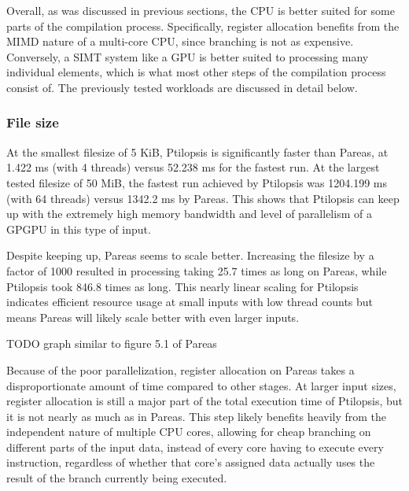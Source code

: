 \documentclass[12pt,dvipsnames]{article}
\newcommand{\helpme}[1]{{\color{red}#1}}
\begin{document}
Overall, as was discussed in previous sections, the CPU is better suited for some parts of the compilation process. Specifically, register allocation benefits from the MIMD nature of a multi-core CPU, since branching is not as expensive. Conversely, a SIMT system like a GPU is better suited to processing many individual elements, which is what most other steps of the compilation process consist of. The previously tested workloads are discussed in detail below.

\subsubsection*{File size}
At the smallest filesize of 5 KiB, Ptilopsis is significantly faster than Pareas, at 1.422 ms (with 4 threads) versus 52.238 ms for the fastest run. At the largest tested filesize of 50 MiB, the fastest run achieved by Ptilopsis was 1204.199 ms (with 64 threads) versus 1342.2 ms by Pareas. This shows that Ptilopsis can keep up with the extremely high memory bandwidth and level of parallelism of a GPGPU in this type of input.

Despite keeping up, Pareas seems to scale better. Increasing the filesize by a factor of 1000 resulted in processing taking 25.7 times as long on Pareas, while Ptilopsis took 846.8 times as long. This nearly linear scaling for Ptilopsis indicates efficient resource usage at small inputs with low thread counts but means Pareas will likely scale better with even larger inputs.

\helpme{TODO graph similar to figure 5.1 of Pareas}

Because of the poor parallelization, register allocation on Pareas takes a disproportionate amount of time compared to other stages. At larger input sizes, register allocation is still a major part of the total execution time of Ptilopsis, but it is not nearly as much as in Pareas. This step likely benefits heavily from the independent nature of multiple CPU cores, allowing for cheap branching on different parts of the input data, instead of every core having to execute every instruction, regardless of whether that core's assigned data actually uses the result of the branch currently being executed.
\end{document}
